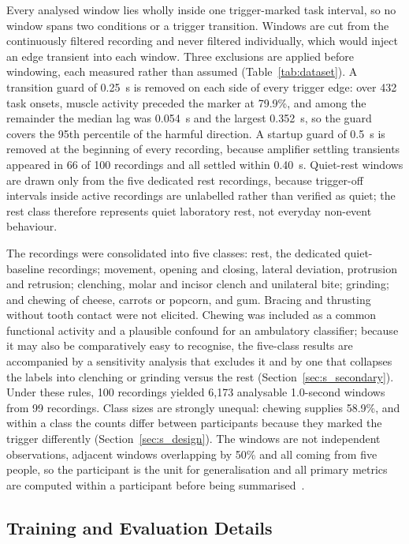 \documentclass[journal]{IEEEtran}
\begin{document}
Every analysed window lies wholly inside one trigger-marked task interval, so no window spans two conditions or a trigger transition. Windows are cut from the continuously filtered recording and never filtered individually, which would inject an edge transient into each window. Three exclusions are applied before windowing, each measured rather than assumed (Table~\ref{tab:dataset}). A transition guard of 0.25~s is removed on each side of every trigger edge: over 432 task onsets, muscle activity preceded the marker at 79.9\%, and among the remainder the median lag was 0.054~s and the largest 0.352~s, so the guard covers the 95th percentile of the harmful direction. A startup guard of 0.5~s is removed at the beginning of every recording, because amplifier settling transients appeared in 66 of 100 recordings and all settled within 0.40~s. Quiet-rest windows are drawn only from the five dedicated rest recordings, because trigger-off intervals inside active recordings are unlabelled rather than verified as quiet; the rest class therefore represents quiet laboratory rest, not everyday non-event behaviour.

The recordings were consolidated into five classes: rest, the dedicated quiet-baseline recordings; movement, opening and closing, lateral deviation, protrusion and retrusion; clenching, molar and incisor clench and unilateral bite; grinding; and chewing of cheese, carrots or popcorn, and gum. Bracing and thrusting without tooth contact were not elicited. Chewing was included as a common functional activity and a plausible confound for an ambulatory classifier; because it may also be comparatively easy to recognise, the five-class results are accompanied by a sensitivity analysis that excludes it and by one that collapses the labels into clenching or grinding versus the rest (Section~\ref{sec:s_secondary}). Under these rules, 100 recordings yielded 6,173 analysable 1.0-second windows from 99 recordings. Class sizes are strongly unequal: chewing supplies 58.9\%, and within a class the counts differ between participants because they marked the trigger differently (Section~\ref{sec:s_design}). The windows are not independent observations, adjacent windows overlapping by 50\% and all coming from five people, so the participant is the unit for generalisation and all primary metrics are computed within a participant before being summarised~\cite{saeb2017need,little2017using,roberts2017cross}.

\subsection{Training and Evaluation Details}
\end{document}
